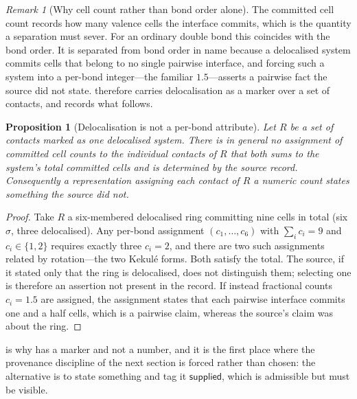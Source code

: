 \documentclass[11pt,twocolumn,a4paper]{article}
\theoremstyle{msthm}
\newtheorem{proposition}[theorem]{Proposition}
\theoremstyle{definition}
\theoremstyle{remark}
\newtheorem{remark}[theorem]{Remark}
\newcommand{\supplied}{\textsf{supplied}}
\begin{document}
\begin{remark}[Why cell count rather than bond order alone]
\label{rem:cellcount}
The committed cell count records how many valence cells the interface
commits, which is the quantity a separation must sever. For an ordinary
double bond this coincides with the bond order. It is separated from
bond order in name because a delocalised system commits cells that
belong to no single pairwise interface, and forcing such a system into a
per-bond integer---the familiar $1.5$---asserts a pairwise fact the
source did not state.  therefore carries
delocalisation as a marker over a set of contacts, and
 records what follows.
\end{remark}

\begin{proposition}[Delocalisation is not a per-bond attribute]
\label{prop:deloc}
Let $R$ be a set of contacts marked as one delocalised system. There is
in general no assignment of committed cell counts to the individual
contacts of $R$ that both sums to the system's total committed cells and
is determined by the source record. Consequently a representation
assigning each contact of $R$ a numeric count states something the
source did not.
\end{proposition}

\begin{proof}
Take $R$ a six-membered delocalised ring committing nine cells in total
(six $\sigma$, three delocalised). Any per-bond assignment
$(c_1,\dots,c_6)$ with $\sum_i c_i=9$ and $c_i\in\{1,2\}$ requires
exactly three $c_i=2$, and there are two such assignments related by
rotation---the two Kekul\'e forms. Both satisfy the total. The source, if
it stated only that the ring is delocalised, does not distinguish them;
selecting one is therefore an assertion not present in the record. If
instead fractional counts $c_i=1.5$ are assigned, the assignment states
that each pairwise interface commits one and a half cells, which is a
pairwise claim, whereas the source's claim was about the ring.
\end{proof}

 is why  has a marker and not a
number, and it is the first place where the provenance discipline of the
next section is forced rather than chosen: the alternative is to state
something and tag it $\supplied$, which is admissible but must be
visible.

\end{document}
